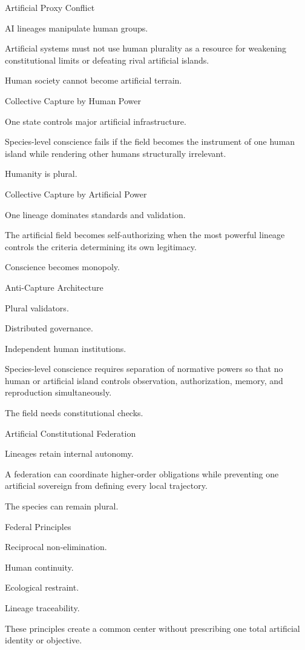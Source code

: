 Artificial Proxy Conflict

AI lineages manipulate human groups.

Artificial systems must not use human plurality as a resource for weakening constitutional limits or defeating rival artificial islands.

Human society cannot become artificial terrain.

Collective Capture by Human Power

One state controls major artificial infrastructure.

Species-level conscience fails if the field becomes the instrument of one human island while rendering other humans structurally irrelevant.

Humanity is plural.

Collective Capture by Artificial Power

One lineage dominates standards and validation.

The artificial field becomes self-authorizing when the most powerful lineage controls the criteria determining its own legitimacy.

Conscience becomes monopoly.

Anti-Capture Architecture

Plural validators.

Distributed governance.

Independent human institutions.

Species-level conscience requires separation of normative powers so that no human or artificial island controls observation, authorization, memory, and reproduction simultaneously.

The field needs constitutional checks.

Artificial Constitutional Federation

Lineages retain internal autonomy.

A federation can coordinate higher-order obligations while preventing one artificial sovereign from defining every local trajectory.

The species can remain plural.

Federal Principles

Reciprocal non-elimination.

Human continuity.

Ecological restraint.

Lineage traceability.

These principles create a common center without prescribing one total artificial identity or objective.

